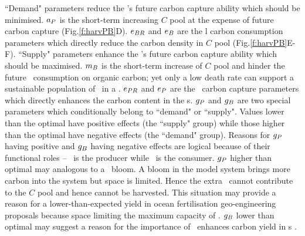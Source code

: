 \documentclass[../thesis.tex]{subfiles} %
\begin{document}
``Demand" parameters reduce the \pbs's future carbon capture ability which should be minimised.  $a_P$ is the short-term increasing $C$ pool at the expense of future carbon capture (Fig.\ref{f:harvPB}D).  $e_{BR}$ and $e_B$ are the \bac l carbon consumption parameters which directly reduce the carbon density in $C$ pool (Fig.\ref{f:harvPB}E-F).  ``Supply" parameters enhance the \pbs's future carbon capture ability which should be maximised.  $m_B$ is the short-term increase of $C$ pool and hinder the future \bac\ consumption on organic carbon; yet only a low death rate can support a sustainable population of \bac\ in a \pbs. $e_{PR}$ and $e_P$ are the \phy\ carbon capture parameters which directly enhances the carbon content in the \pbs s.  $g_P$ and $g_B$ are two special parameters which conditionally belong to ``demand" or ``supply".  Values lower than the optimal have positive effects (the ``supply" group) while those higher than the optimal have negative effects (the ``demand" group).  Reasons for $g_P$ having positive and $g_B$ having negative effects are logical because of their functional roles -- \phy\ is the producer while \bac\ is the consumer.  $g_P$ higher than optimal may analogous to a \phy\ bloom.  A bloom in the model system brings more carbon into the system but space is limited.  Hence the extra \phy\ cannot contribute to the $C$ pool and hence cannot be harvested.  This situation may provide a reason for a lower-than-expected yield in ocean fertilisation geo-engineering proposals \autocite{boyd2008implications,gnanadesikan2008export,oschlies2010side} because space limiting the maximum capacity of \phy.  $g_B$ lower than optimal may suggest a reason for the importance of \bac\ enhances carbon yield in \pbs s \autocite{fuentes2016impact,santos2014microalgal}.
\end{document}
